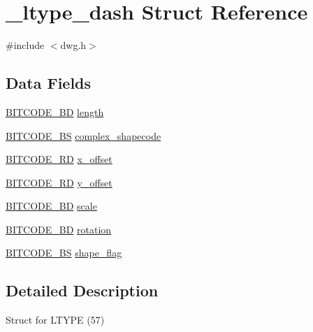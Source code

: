 \hypertarget{struct__ltype__dash}{\section{\-\_\-ltype\-\_\-dash \-Struct \-Reference}
\label{struct__ltype__dash}
}


{\ttfamily \#include $<$dwg.\-h$>$}

\subsection*{\-Data \-Fields}
\begin{DoxyCompactItemize}
\item 
\hyperlink{dwg_8h_a3c1e6781466b74ba07785d57da70ed97}{\-B\-I\-T\-C\-O\-D\-E\-\_\-\-B\-D} \hyperlink{struct__ltype__dash_a1313a34f37e918fa1911f44eedd247d5}{length}
\item 
\hyperlink{dwg_8h_a94297606fbd4a4ff97e8add284af0809}{\-B\-I\-T\-C\-O\-D\-E\-\_\-\-B\-S} \hyperlink{struct__ltype__dash_a868ce87efb2f489ed814f179a41bc415}{complex\-\_\-shapecode}
\item 
\hyperlink{dwg_8h_a309e7e59a4030a89943640d0d327cef7}{\-B\-I\-T\-C\-O\-D\-E\-\_\-\-R\-D} \hyperlink{struct__ltype__dash_a1ff0ff9780ecb460e5b318ff76859214}{x\-\_\-offset}
\item 
\hyperlink{dwg_8h_a309e7e59a4030a89943640d0d327cef7}{\-B\-I\-T\-C\-O\-D\-E\-\_\-\-R\-D} \hyperlink{struct__ltype__dash_ad82e83273fb4db849f4543ece57d719b}{y\-\_\-offset}
\item 
\hyperlink{dwg_8h_a3c1e6781466b74ba07785d57da70ed97}{\-B\-I\-T\-C\-O\-D\-E\-\_\-\-B\-D} \hyperlink{struct__ltype__dash_a0913cb34e7be9ea8e1a040c152968a8e}{scale}
\item 
\hyperlink{dwg_8h_a3c1e6781466b74ba07785d57da70ed97}{\-B\-I\-T\-C\-O\-D\-E\-\_\-\-B\-D} \hyperlink{struct__ltype__dash_a98d19a4a7414a5baa253f1eedbd0957d}{rotation}
\item 
\hyperlink{dwg_8h_a94297606fbd4a4ff97e8add284af0809}{\-B\-I\-T\-C\-O\-D\-E\-\_\-\-B\-S} \hyperlink{struct__ltype__dash_ab082d9e29c4dbfe6112f07c50b26215a}{shape\-\_\-flag}
\end{DoxyCompactItemize}


\subsection{\-Detailed \-Description}
\-Struct for \-L\-T\-Y\-P\-E (57) 

